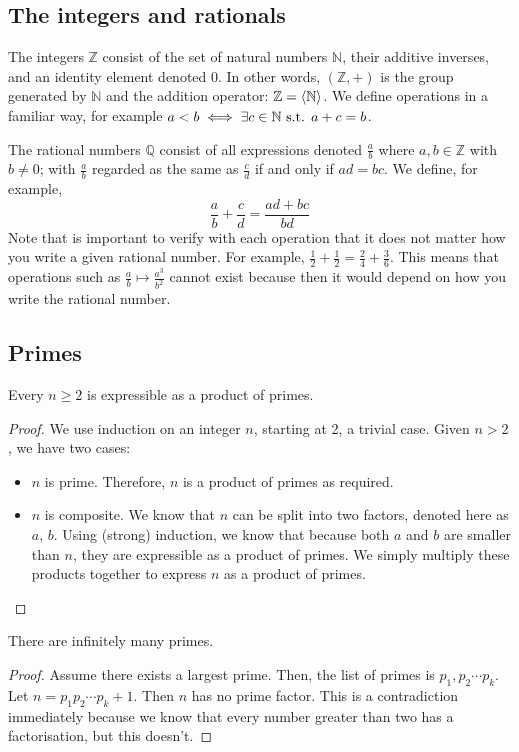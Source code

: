 \subsection{The integers and rationals}
The integers \(\mathbb Z\) consist of the set of natural numbers \(\mathbb N\), their additive inverses, and an identity element denoted 0.
In other words, \((\mathbb Z, +)\) is the group generated by \(\mathbb N\) and the addition operator: \(\mathbb Z = \left\langle{} \mathbb N \right\rangle\).
We define operations in a familiar way, for example \(a < b \iff \exists c \in \mathbb N \text{ s.t. } a+c = b\).

The rational numbers \(\mathbb Q\) consist of all expressions denoted \(\frac{a}{b}\) where \(a, b \in \mathbb Z\) with \(b \neq 0\); with \(\frac{a}{b}\) regarded as the same as \(\frac{c}{d}\) if and only if \(ad=bc\).
We define, for example,
\[
	\frac{a}{b} + \frac{c}{d} = \frac{ad + bc}{bd}
\]
Note that is important to verify with each operation that it does not matter how you write a given rational number.
For example, \(\frac{1}{2} + \frac{1}{2} = \frac{2}{4} + \frac{3}{6}\).
This means that operations such as \(\frac{a}{b} \mapsto \frac{a^3}{b^2}\) cannot exist because then it would depend on how you write the rational number.

\subsection{Primes}
\begin{proposition}
	Every \(n \geq 2\) is expressible as a product of primes.
\end{proposition}
\begin{proof}
	We use induction on an integer \(n\), starting at 2, a trivial case.
	Given \(n > 2\), we have two cases:
	\begin{itemize}
		\item \(n\) is prime.
		      Therefore, \(n\) is a product of primes as required.
		\item \(n\) is composite.
		      We know that \(n\) can be split into two factors, denoted here as \(a\), \(b\).
		      Using (strong) induction, we know that because both \(a\) and \(b\) are smaller than \(n\), they are expressible as a product of primes.
		      We simply multiply these products together to express \(n\) as a product of primes.
	\end{itemize}
\end{proof}
\begin{proposition}
	There are infinitely many primes.
\end{proposition}
\begin{proof}
	Assume there exists a largest prime.
	Then, the list of primes is \(p_1, p_2 \cdots p_k\).
	Let \(n=p_1 p_2 \cdots p_k + 1\).
	Then \(n\) has no prime factor.
	This is a contradiction immediately because we know that every number greater than two has a factorisation, but this doesn't.
\end{proof}

